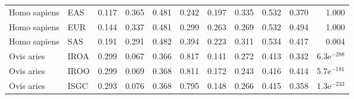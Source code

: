 \begin{longtable}{llrrrrrrrrr}
        Homo sapiens &                       EAS &                              0.117 &                               0.365 &                 0.481 &                 0.242 &                              0.197 &                               0.335 &                 0.532 &                 0.370 &         1.000 \\
        Homo sapiens &                       EUR &                              0.144 &                               0.337 &                 0.481 &                 0.299 &                              0.263 &                               0.269 &                 0.532 &                 0.494 &         1.000 \\
        Homo sapiens &                       SAS &                              0.191 &                               0.291 &                 0.482 &                 0.394 &                              0.223 &                               0.311 &                 0.534 &                 0.417 &         0.004 \\
          Ovis aries &                      IROA &                              0.299 &                               0.067 &                 0.366 &                 0.817 &                              0.141 &                               0.272 &                 0.413 &                 0.342 & 6.3e$^{-288}$ \\
          Ovis aries &                      IROO &                              0.299 &                               0.069 &                 0.368 &                 0.811 &                              0.172 &                               0.243 &                 0.416 &                 0.414 & 5.7e$^{-181}$ \\
          Ovis aries &                      ISGC &                              0.293 &                               0.076 &                 0.368 &                 0.795 &                              0.148 &                               0.266 &                 0.415 &                 0.358 & 1.3e$^{-233}$ \\
\end{longtable}
